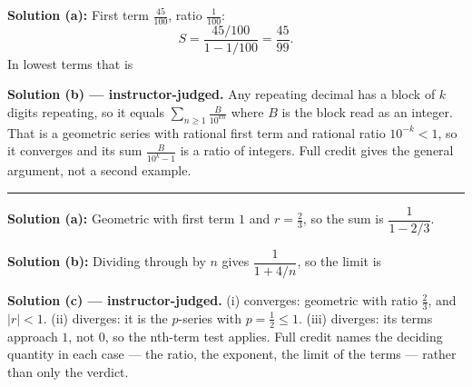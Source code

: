 \documentclass[12pt]{article}
\begin{document}

\textbf{Solution (a):} First term $\frac{45}{100}$, ratio $\frac{1}{100}$:
\[ S = \frac{45/100}{1 - 1/100} = \frac{45}{99}. \]
In lowest terms that is 

\textbf{Solution (b) --- instructor-judged.} Any repeating decimal has a block of $k$ digits repeating, so it equals $\sum_{n\ge1} \frac{B}{10^{kn}}$ where $B$ is the block read as an integer. That is a geometric series with rational first term and rational ratio $10^{-k} < 1$, so it converges and its sum $\frac{B}{10^{k}-1}$ is a ratio of integers. Full credit gives the general argument, not a second example.

\vspace{0.2cm}\noindent\rule{\linewidth}{0.2pt}\vspace{0.2cm}


\textbf{Solution (a):} Geometric with first term $1$ and $r = \frac{2}{3}$, so the sum is $\dfrac{1}{1 - 2/3}$. 

\textbf{Solution (b):} Dividing through by $n$ gives $\dfrac{1}{1 + 4/n}$, so the limit is 

\textbf{Solution (c) --- instructor-judged.} (i) converges: geometric with ratio $\frac{2}{3}$, and $|r| < 1$. (ii) diverges: it is the $p$-series with $p = \frac{1}{2} \le 1$. (iii) diverges: its terms approach $1$, not $0$, so the nth-term test applies. Full credit names the deciding quantity in each case --- the ratio, the exponent, the limit of the terms --- rather than only the verdict.
\end{document}
